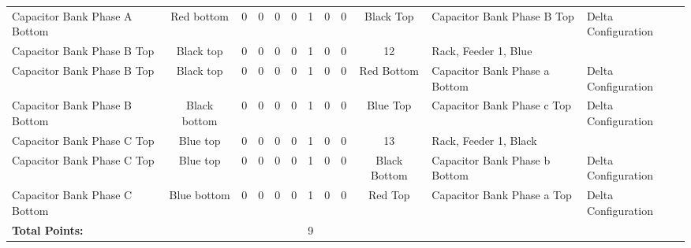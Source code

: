\begin{table}[!htp]
{\begin{tabular}{lcccccccccll}
			Capacitor Bank Phase A Bottom         & Red bottom              & 0                                           & 0                                          & 0           & 0           & 1            & 0                & 0 & Black Top                    & Capacitor Bank Phase B Top       & Delta Configuration \\
			Capacitor Bank Phase B Top            & Black top               & 0                                           & 0                                          & 0           & 0           & 1            & 0                & 0 & 12                           & Rack, Feeder 1, Blue             &                     \\
			Capacitor Bank Phase B Top            & Black top               & 0                                           & 0                                          & 0           & 0           & 1            & 0                & 0 & Red Bottom                   & Capacitor Bank Phase a Bottom    & Delta Configuration \\
			Capacitor Bank Phase B Bottom         & Black bottom            & 0                                           & 0                                          & 0           & 0           & 1            & 0                & 0 & Blue Top                     & Capacitor Bank Phase c Top       & Delta Configuration \\
			Capacitor Bank Phase C Top            & Blue top                & 0                                           & 0                                          & 0           & 0           & 1            & 0                & 0 & 13                           & Rack, Feeder 1, Black            &                     \\
			Capacitor Bank Phase C Top            & Blue top                & 0                                           & 0                                          & 0           & 0           & 1            & 0                & 0 & Black Bottom                 & Capacitor Bank Phase b Bottom    & Delta Configuration \\
			Capacitor Bank Phase C Bottom         & Blue bottom             & 0                                           & 0                                          & 0           & 0           & 1            & 0                & 0 & Red Top                      & Capacitor Bank Phase a Top       & Delta Configuration \\ \bottomrule
			\textbf{Total Points:}                &                         &                                             &                                            &             &             & 9            &                  &   &                              &                                  &                     \\ \bottomrule
		\end{tabular}
	}
\end{table}
